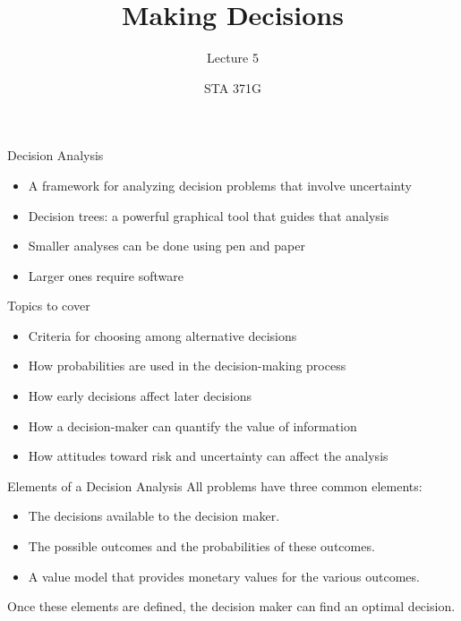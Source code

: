 \documentclass{beamer}\usepackage[]{graphicx}\usepackage[]{color}
\title{Making Decisions}
\subtitle{Lecture 5}
\author{STA 371G}
\begin{document}
\frame{\maketitle}

\begin{darkframes}
  \begin{frame}[fragile]{Decision Analysis}
    \begin{itemize}[<+->]
      \item A framework for analyzing decision problems that involve uncertainty
      \item Decision trees: a powerful graphical tool that guides that analysis
      \item Smaller analyses can be done using pen and paper
      \item Larger ones require software
      \end{itemize}
  \end{frame}


  \begin{frame}[fragile]{Topics to cover}
    \begin{itemize}[<+->]
      \item Criteria for choosing among alternative decisions
      \item How probabilities are used in the decision-making process
      \item How early decisions affect later decisions
      \item How a decision-maker can quantify the value of information
      \item How attitudes toward risk and uncertainty can affect the analysis
    \end{itemize}
  \end{frame}


  \begin{frame}[fragile]{Elements of a Decision Analysis}
    All problems have three common elements:

    \begin{itemize}
      \item The decisions available to the decision maker.
      \item The possible outcomes and the probabilities of these outcomes.
      \item A value model that provides monetary values for the various outcomes.
    \end{itemize}

    Once these elements are defined, the decision maker can find an optimal decision.
  \end{frame}



\end{darkframes}
\end{document}
